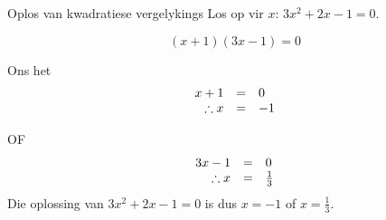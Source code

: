      \vspace*{-30pt}   
\begin{wex}
{Oplos van kwadratiese vergelykings }
{Los op vir $x$: $3{x}^{2}+2x-1=0$.}
{

\begin{equation*}
(x+1)(3x-1)=0
\end{equation*}

Ons het
\begin{equation*}
     \begin{array}{ccc}\hfill x+1&=&0\hfill \\
	\hfill \therefore x&=&-1
    \end{array}
\end{equation*}

OF
\begin{equation*}
     \begin{array}{ccc}\hfill 3x-1&=&0\hfill \\
	\hfill \therefore x&=&\frac{1}{3}
    \end{array}
\end{equation*}
Die oplossing van $3{x}^{2}+2x-1=0$ is dus $x=-1$ of $x=\frac{1}{3}$.
}
\end{wex}


